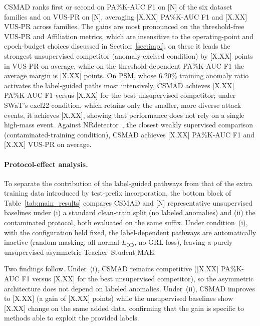 CSMAD ranks first or second on PA\%K-AUC F1 on [N] of the six dataset families and on VUS-PR
on [N], %
averaging [X.XX] PA\%K-AUC F1 and [X.XX] VUS-PR %
across families.
The gains are most pronounced on the threshold-free VUS-PR and Affiliation metrics, which are
insensitive to the operating-point and epoch-budget choices discussed in
Section~\ref{sec:impl}; on these it leads the strongest unsupervised competitor (anomaly-excised
condition) by [X.XX] points in VUS-PR on average, while on the threshold-dependent PA\%K-AUC F1
the average margin is [X.XX] points.
On PSM, whose 6.20\% training anomaly ratio activates the label-guided paths most intensively,
CSMAD achieves [X.XX] PA\%K-AUC F1 versus [X.XX] for the best unsupervised competitor;
under SWaT's excl22 condition, which retains only the smaller, more diverse attack events, it
achieves [X.XX], showing that performance does not rely on a single high-mass event.
Against NRdetector~\cite{wang2025nrdetector}, the closest weakly supervised comparison
(contaminated-training condition), CSMAD achieves [X.XX] PA\%K-AUC F1 and [X.XX] VUS-PR on
average.

\paragraph{Protocol-effect analysis.}
To separate the contribution of the label-guided pathways from that of the extra training data
introduced by test-prefix incorporation, the bottom block of Table~\ref{tab:main_results} compares
CSMAD and [N] representative unsupervised baselines under (i) a standard clean-train split (no
labeled anomalies) and (ii) the contaminated protocol, both evaluated on the same suffix.
Under condition~(i), with the configuration held fixed, the label-dependent pathways are
automatically inactive (random masking, all-normal $L_{\mathrm{OD}}$, no GRL loss), leaving a
purely unsupervised asymmetric Teacher--Student MAE.

Two findings follow.
Under~(i), CSMAD remains competitive
([X.XX] PA\%K-AUC F1 versus [X.XX] for the best unsupervised competitor),
so the asymmetric architecture does not depend on labeled anomalies.
Under~(ii), CSMAD improves to [X.XX]
(a gain of [X.XX] points) while the unsupervised baselines show [X.XX] change on the same
added data, confirming that the gain is specific to methods able to exploit the provided labels.

